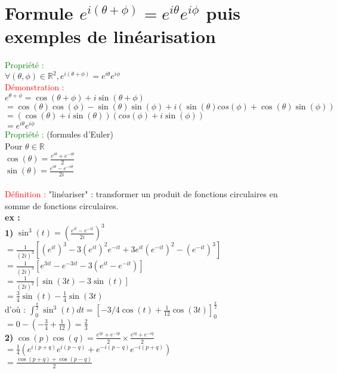 \documentclass{article}
\begin{document}
\section{Formule $e^{i(\theta + \phi)}=e^{i \theta}e^{i \phi}$ puis exemples de linéarisation}
\textcolor{green}{Propriété :} \\
\indent $\forall(\theta,\phi) \in \mathbb{R}^2,e^{i(\theta+\phi)}=e^{i\theta}e^{i\phi}$ \\
\textcolor{red}{Démonstration :} \\
\indent $e^{\theta+\phi}=\cos(\theta +\phi)+ i \sin(\theta +\phi)$ \\
\indent $=\cos(\theta)\cos(\phi)-\sin(\theta)\sin(\phi)+i	(\sin(\theta)cos(\phi)+\cos(\theta)\sin(\phi))$ \\
\indent $=(\cos(\theta)+i\sin(\theta))(cos(\phi)+i\sin(\phi))$ \\
\indent $=e^{i\theta}e^{i\phi}$\\
\textcolor{green}{Propriété :} (formules d'Euler) \\
\indent Pour $\theta \in \mathbb{R}$ \\
\indent $\cos(\theta)=\frac{e^{i\theta}+e^{-i\theta}}{2}$  \\
\indent $\sin(\theta)=\frac{e^{i\theta}-e^{-i\theta}}{2i}$ \\ \\
\textcolor{red}{Définition :} "linéariser" : transformer un produit de fonctions circulaires en somme de fonctions circulaires. \\
{\bf ex :} \\
{\bf 1)} $\sin^3(t)=(\frac{e^{it}-e^{-it}}{2i})^3$ \\
\indent $=\frac{1}{(2i)^3}[(e^{it})^3-3(e^{it})^2e^{-it}+3e^{it}(e^{-it})^2-(e^{-it})^3]$ \\
\indent $=\frac{1}{(2i)^3}[e^{3it}-e^{-3it}-3(e^{it}-e^{-it})]$ \\
\indent $=\frac{1}{(2i)^2}[\sin(3t)-3\sin(t)]$ \\
\indent $=\frac{3}{4}\sin(t)-\frac{1}{4}\sin(3t)$ \\
d'où : $\int_0^{\frac{\pi}{2}} \sin^3(t)dt=[-3/4 \cos(t) +\frac{1}{12}\cos(3t)]_0^{\frac{\pi}{2}}$ \\
\indent $=0-(-\frac{3}{4}+\frac{1}{12})=\frac{2}{3}$ \\
{\bf 2)} $\cos(p)\cos(q)=\frac{e^{ip}+e^{-ip}}{2}\times \frac{e^{iq}+e^{-iq}}{2}$ \\
\indent $=\frac{1}{4}(e^{i(p+q)}e^{i(p-q)}+e^{-i(p-q)}e^{-i(p+q)})$ \\
\indent $=\frac{\cos(p+q)+\cos(p-q)}{2}$
\end{document}
